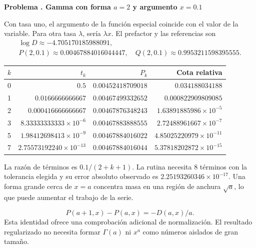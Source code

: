 \documentclass[11pt,a4paper]{article}
\theoremstyle{definition}
\newcounter{problema}
\newenvironment{resuelto}[1]{\refstepcounter{problema}\par\medskip\Needspace{6\baselineskip}\textbf{Problema \theproblema. #1}\par}{\par\medskip}
\begin{document}
\begin{resuelto}{Gamma con forma $a=2$ y argumento $x=0.1$}
Con tasa uno, el argumento de la función especial coincide con el valor de la variable. Para otra tasa $\lambda$, sería $\lambda x$. El prefactor y las referencias son
\[
\begin{gathered}
\log D\approx-4.705170185988091,\\
P(2,0.1)\approx0.00467884016044447,\quad Q(2,0.1)\approx0.9953211598395555.
\end{gathered}
\]

\begin{center}\small\begin{tabular}{lrrr}
\toprule
$k$ & $t_k$ & $P_k$ & Cota relativa\\\midrule
0 & $0.5$ & $0.00452418709018$ & $0.034188034188$\\
1 & $0.0166666666667$ & $0.00467499332652$ & $0.000822909809085$\\
2 & $0.000416666666667$ & $0.00467876348243$ & $1.63891885986\times10^{-5}$\\
3 & $8.33333333333\times10^{-6}$ & $0.00467883888555$ & $2.72488961667\times10^{-7}$\\
5 & $1.98412698413\times10^{-9}$ & $0.00467884016022$ & $4.85025220979\times10^{-11}$\\
7 & $2.75573192240\times10^{-13}$ & $0.00467884016044$ & $5.37818202872\times10^{-15}$\\
\bottomrule\end{tabular}\end{center}

La razón de términos es $0.1/(2+k+1)$. La rutina necesita 8 términos con la tolerancia elegida y su error absoluto observado es $2.25193260346\times10^{-17}$. Una forma grande cerca de $x=a$ concentra masa en una región de anchura $\sqrt a$, lo que puede aumentar el trabajo de la serie.

\[
P(a+1,x)-P(a,x)=-D(a,x)/a.
\]
Esta identidad ofrece una comprobación adicional de normalización. El resultado regularizado no necesita formar $\Gamma(a)$ ni $x^a$ como números aislados de gran tamaño.
\end{resuelto}
\end{document}
